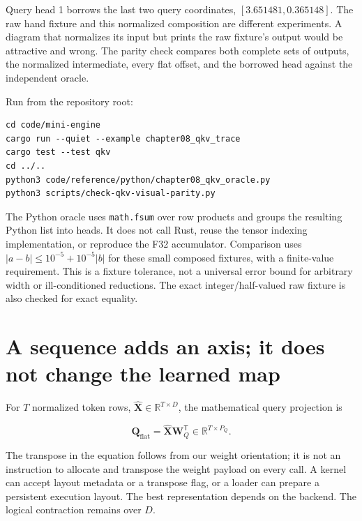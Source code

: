 Query head 1 borrows the last two query coordinates,
\([3.651481,0.365148]\). The raw hand fixture and this normalized
composition are different experiments. A diagram that normalizes its
input but prints the raw fixture's output would be attractive and wrong.
The parity check compares both complete sets of outputs, the normalized
intermediate, every flat offset, and the borrowed head against the
independent oracle.

Run from the repository root:

\begin{verbatim}
cd code/mini-engine
cargo run --quiet --example chapter08_qkv_trace
cargo test --test qkv
cd ../..
python3 code/reference/python/chapter08_qkv_oracle.py
python3 scripts/check-qkv-visual-parity.py
\end{verbatim}

The Python oracle uses \texttt{math.fsum} over row products and groups
the resulting Python list into heads. It does not call Rust, reuse the
tensor indexing implementation, or reproduce the F32 accumulator.
Comparison uses \(|a-b|\le 10^{-5}+10^{-5}|b|\) for these small composed
fixtures, with a finite-value requirement. This is a fixture tolerance,
not a universal error bound for arbitrary width or ill-conditioned
reductions. The exact integer/half-valued raw fixture is also checked
for exact equality.

\section{A sequence adds an axis; it does not change the learned
map}\label{a-sequence-adds-an-axis-it-does-not-change-the-learned-map}


For \(T\) normalized token rows,
\(\widehat{\mathbf{X}}\in\mathbb{R}^{T\times D}\), the mathematical
query projection is

\begin{equation}
\mathbf{Q}_{\mathrm{flat}}=
\widehat{\mathbf{X}}\mathbf{W}_Q^{\mathsf T}
\in\mathbb{R}^{T\times P_Q}.
\end{equation}

The transpose in the equation follows from our weight orientation; it is
not an instruction to allocate and transpose the weight payload on every
call. A kernel can accept layout metadata or a transpose flag, or a
loader can prepare a persistent execution layout. The best
representation depends on the backend. The logical contraction remains
over \(D\).

